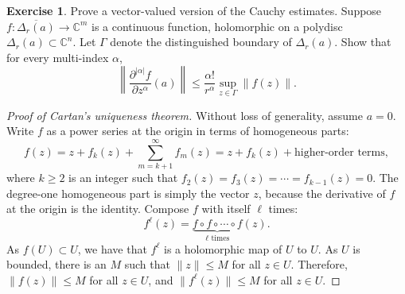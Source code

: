 \documentclass[12pt,openany]{book}
\newcommand{\snorm}[1]{\lVert {#1} \rVert}
\newcommand{\abs}[1]{\left\lvert {#1} \right\rvert}
\newcommand{\norm}[1]{\left\lVert {#1} \right\rVert}
\newcommand{\C}{{\mathbb{C}}}
\theoremstyle{plain}
\theoremstyle{remark}
\theoremstyle{definition}
\newenvironment{exbox}{%
    \def\FrameCommand{\vrule width 1pt \relax\hspace{10pt}}%
    \MakeFramed{\advance\hsize-\width\FrameRestore}%
}{%
    \endMakeFramed
}
\theoremstyle{exercise}
\newtheorem{exercise}{Exercise}[section]
\theoremstyle{example}
\begin{document}
\begin{exbox}
\begin{exercise}
Prove a vector-valued version of the Cauchy estimates.  Suppose $f
\colon \overline{\Delta_r(a)} \to \C^m$ is a continuous function, holomorphic
on a polydisc $\Delta_r(a) \subset \C^n$.  Let $\Gamma$ denote the distinguished
boundary of $\Delta_r(a)$.  Show that for every multi-index $\alpha$,
\begin{equation*}
\norm{\frac{\partial^{\abs{\alpha}}f}{\partial z^\alpha} (a)}
\leq
\frac{\alpha!}{r^\alpha} \sup_{z\in \Gamma} \norm{f(z)} .
\end{equation*}
\end{exercise}
\end{exbox}



\begin{proof}[Proof of Cartan's uniqueness theorem]
Without loss of generality, assume $a=0$.
Write $f$ as a power series at the origin in terms of homogeneous parts:
\begin{equation*}
f(z) = z + f_k(z) + \sum_{m=k+1}^\infty f_m(z) = z + f_k(z) +
\text{higher-order terms},
\end{equation*}
where $k \geq 2$ is an integer such that
$f_2(z)=f_3(z)=\cdots=f_{k-1}(z)=0$.
The degree-one homogeneous part is simply the vector $z$,
because
the derivative of $f$ at the origin is the identity.
Compose $f$ with itself $\ell$ times:
\begin{equation*}
f^\ell(z) = \underbrace{f \circ f \circ \cdots \circ f}_{\ell\text{ times}}
(z) .
\end{equation*}
As $f(U) \subset U$, we have that $f^\ell$ is a holomorphic map
of $U$ to $U$.  As $U$ is bounded, there is an $M$ such that $\snorm{z} \leq
M$ for all $z \in U$.  Therefore, $\snorm{f(z)} \leq M$ for all $z \in U$, and
$\snorm{f^\ell(z)} \leq M$ for all $z \in U$.


\end{proof}
\end{document}

